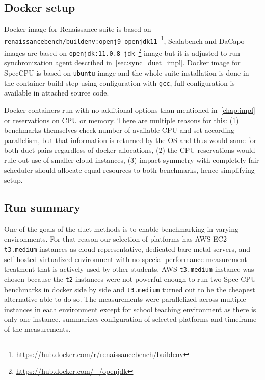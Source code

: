 \subsection{Docker setup}
Docker image for Renaissance suite is based on \lstinline{renaissancebench/buildenv:openj9-openjdk11}~\footnote{\url{https://hub.docker.com/r/renaissancebench/buildenv}}, Scalabench and DaCapo images are based on \lstinline{openjdk:11.0.8-jdk}~\footnote{\url{https://hub.docker.com/_/openjdk}} image but it is adjusted to run synchronization agent described in~\cref{sec:sync_duet_impl}.
Docker image for SpecCPU is based on \lstinline{ubuntu} image and the whole suite installation is done in the container build step using configuration with \lstinline{gcc}, full configuration is available in attached source code.

Docker containers run with no additional options than mentioned in~\cref{chap:impl} or reservations on CPU or memory.
There are multiple reasons for this: (1) benchmarks themselves check number of available CPU and set according parallelism, but that information is returned by the OS and thus would same for both duet pairs regardless of docker allocations, (2) the CPU reservations would rule out use of smaller cloud instances, (3) impact symmetry with completely fair scheduler should allocate equal resources to both benchmarks, hence simplifying setup.

\subsection{Run summary}

One of the goals of the duet methods is to enable benchmarking in varying environments.
For that reason our selection of platforms has AWS EC2 \lstinline{t3.medium} instances as cloud representative, dedicated bare metal servers, and self-hosted virtualized environment with no special performance measurement treatment that is actively used by other students.
AWS \lstinline{t3.medium} instance was chosen because the \lstinline{t2} instances were not powerful enough to run two Spec CPU benchmarks in docker side by side and \lstinline{t3.medium} turned out to be the cheapest alternative able to do so.
The measurements were parallelized across multiple instances in each environment except for school teaching environment as there is only one instance.
 summarizes configuration of selected platforms and timeframe of the measurements.

